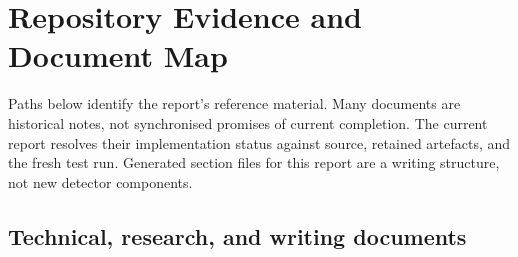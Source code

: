 \section{Repository Evidence and Document Map}

Paths below identify the report's reference material. Many documents are
historical notes, not synchronised promises of current completion. The current
report resolves their implementation status against source, retained artefacts,
and the fresh test run. Generated section files for this report are a writing
structure, not new detector components.

\subsection{Technical, research, and writing documents}

